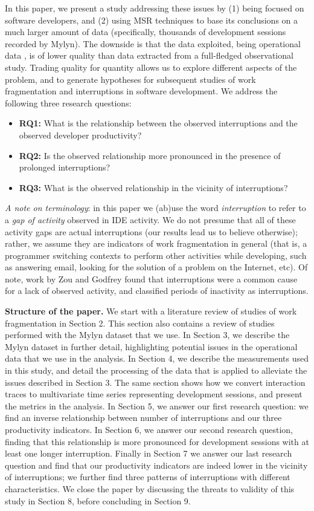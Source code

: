 \documentclass[conference]{IEEEtran}
\begin{document}
In this paper, we present a study addressing these issues by (1) being focused on software developers, and (2) using MSR techniques to base its conclusions on a much larger amount of data (specifically, thousands of development sessions recorded by Mylyn). The downside is that the data exploited, being operational data \cite{M14}, is of lower quality than data extracted from a full-fledged observational study. Trading quality for quantity allows us to explore different aspects of the problem, and to generate hypotheses for subsequent studies of work fragmentation and interruptions in software development. We address the following three research questions:
\begin{itemize}
\item \textbf{RQ1:} What is the relationship between the observed interruptions and the observed developer productivity? 
\item \textbf{RQ2:} Is the observed relationship more pronounced in the presence of prolonged interruptions?
\item \textbf{RQ3:}  What is the observed relationship in the vicinity of interruptions?
\end{itemize}

\emph{A note on terminology}: in this paper we (ab)use the word \emph{interruption} to refer to a \emph{gap of activity} observed in IDE activity. We do not presume that all of these activity gaps are actual interruptions (our results lead us to believe otherwise); rather, we assume they are indicators of work fragmentation in general (that is, a programmer switching contexts to perform other activities while developing, such as answering email, looking for the solution of a problem on the Internet, etc). Of note, work by Zou and Godfrey \cite{ZG06} found that interruptions were a common cause for a lack of observed activity, and classified periods of inactivity as interruptions. %

\textbf{Structure of the paper.} We start with a literature review of studies of work fragmentation in Section 2. This section also contains a review of studies performed with the Mylyn dataset that we use. In Section 3, we describe the Mylyn dataset in further detail, highlighting potential issues in the operational data that we use in the analysis. In Section 4, we describe the measurements used in this study, and detail the processing of the data that is applied to alleviate the issues described in Section 3. The same section shows how we convert interaction traces to multivariate time series representing development sessions, and present the metrics in the analysis. In Section 5, we answer our first research question: we find an inverse relationship between number of interruptions and our three productivity indicators. In Section 6, we answer our second research question, finding that this relationship is more pronounced for development sessions with at least one longer interruption. Finally in Section 7 we answer our last research question and find that our productivity indicators are indeed lower in the vicinity of interruptions; we further find three patterns of interruptions with different characteristics. We close the paper by discussing the threats to validity of this study in Section 8, before concluding in Section 9.
\end{document}
